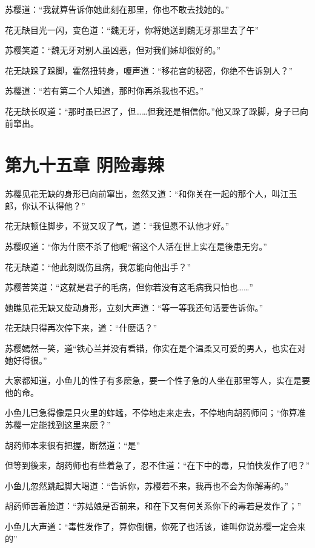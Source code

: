 \documentclass[12pt,oneside]{book}
\begin{document}
苏樱道：``我就算告诉你她此刻在那里，你也不敢去找她的。''

花无缺目光一闪，变色道：``魏无牙，你将她送到魏无牙那里去了午''

苏樱笑道：``魏无牙对别人虽凶恶，但对我们姊却很好的。''

花无缺跺了跺脚，霍然扭转身，嗄声道：``移花宫的秘密，你绝不告诉别人？''

苏樱道：``若有第二个人知道，那时你再杀我也不迟。''

花无缺长叹道：``那时虽已迟了，但\ldots\ldots 但我还是相信你。''他又跺了跺脚，身子已向前窜出。

\hypertarget{ux7b2cux4e5dux5341ux4e94ux7ae0-ux9634ux9669ux6bd2ux8fa3}{%
\chapter{第九十五章
阴险毒辣}\label{ux7b2cux4e5dux5341ux4e94ux7ae0-ux9634ux9669ux6bd2ux8fa3}}

苏樱见花无缺的身形已向前窜出，忽然又道：``和你关在一起的那个人，叫江玉郎，你认不认得他？''

花无缺顿住脚步，不觉又叹了气，道：``我但愿不认他才好。''

苏樱叹道：``你为什麽不杀了他呢``留这个人活在世上实在是後患无穷。''

花无缺道：``他此刻既伤且病，我怎能向他出手？''

苏樱苦笑道：``这就是君子的毛病，但你若没有这毛病我只怕也\ldots\ldots{}''

她瞧见花无缺又旋动身形，立刻大声道：``等一等我还句话要告诉你。''

花无缺只得再次停下来，道：``什麽话？''

苏樱嫣然一笑，道``铁心兰并没有看错，你实在是个温柔又可爱的男人，也实在对她好得很。''

大家都知道，小鱼儿的性子有多麽急，要一个性子急的人坐在那里等人，实在是要他的命。

小鱼儿已急得像是只火里的蚱蜢，不停地走来走去，不停地向胡药师问；``你算准苏樱一定能找到这里来麽？''

胡药师本来很有把握，断然道：``是''

但等到後来，胡药师也有些着急了，忍不住道：``在下中的毒，只怕快发作了吧？''

小鱼儿忽然跳起脚大喝道：``告诉你，苏樱若不来，我再也不会为你解毒的。''

胡药师苦着脸道：``苏姑娘是否前来，和在下又有何关系你下的毒若是发作了；''

小鱼儿大声道：``毒性发作了，算你倒楣，你死了也活该，谁叫你说苏樱一定会来的''
\end{document}
